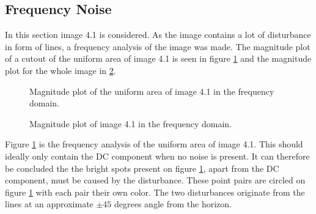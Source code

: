 \subsection{Frequency Noise}
In this section image 4.1 is considered.
As the image contains a lot of disturbance in form of lines, a frequency analysis of the image was made.
The magnitude plot of a cutout of the uniform area of image 4.1 is seen in figure \ref{fig:freq_analysis_uni_p4} and the magnitude plot for the whole image in \ref{fig:freq_analysis_p4}.



\begin{figure}[H]
\centering
{}
\caption{Magnitude plot of the uniform area of image 4.1 in the frequency domain.}
\label{fig:freq_analysis_uni_p4}
\end{figure}


\begin{figure}[H]
\centering
{}

\caption{Magnitude plot of image 4.1 in the frequency domain.}
\label{fig:freq_analysis_p4}
\end{figure}


Figure \ref{fig:freq_analysis_uni_p4} is the frequency analysis of the uniform area of image 4.1.
This should ideally only contain the DC component when no noise is present.
It can therefore be concluded the the bright spots present on figure \ref{fig:freq_analysis_uni_p4}, apart from the DC component, must be caused by the disturbance.
These point pairs are circled on figure \ref{fig:freq_analysis_uni_p4} with each pair their own color.
The two disturbances originate from the lines at an approximate $\pm 45$ degrees angle from the horizon.

